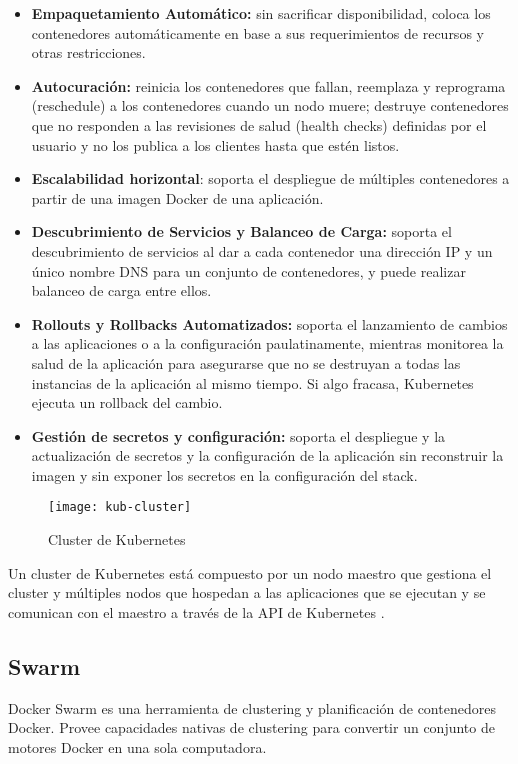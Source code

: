 \begin{itemize}

\item \textbf{Empaquetamiento Automático: }sin sacrificar disponibilidad, coloca los contenedores automáticamente en base a sus requerimientos de recursos y otras restricciones.
\item \textbf{Autocuración: }reinicia los contenedores que fallan, reemplaza y reprograma (reschedule) a los contenedores cuando un nodo muere; destruye contenedores que no responden a las revisiones de salud (health checks) definidas por el usuario y no los publica a los clientes hasta que estén listos.
\item \textbf{Escalabilidad horizontal}: soporta el despliegue de múltiples contenedores a partir de una imagen Docker de una aplicación.
\item \textbf{Descubrimiento de Servicios y Balanceo de Carga: }soporta el descubrimiento de servicios al dar a cada contenedor una dirección IP y un único nombre DNS para un conjunto de contenedores, y puede realizar balanceo de carga entre ellos.
\item \textbf{Rollouts y Rollbacks Automatizados: }soporta el lanzamiento de cambios a las aplicaciones o a la configuración paulatinamente, mientras monitorea la salud de la aplicación para asegurarse que no se destruyan a todas las instancias de la aplicación al mismo tiempo. Si algo fracasa, Kubernetes ejecuta un rollback del cambio.
\item \textbf{Gestión de secretos y configuración: }soporta el despliegue y la actualización de secretos y la configuración de la aplicación sin reconstruir la imagen y sin exponer los secretos en la configuración del stack.

\end{itemize}

\begin{figure}[H]
    \centering
    \texttt{[image: kub-cluster]}
    \caption{ Cluster de Kubernetes \protect\cite{Kubernetes2016-jo}}
    \label{fig:kub-cluster}
\end{figure}

Un cluster de Kubernetes está compuesto por un nodo maestro que gestiona el cluster y múltiples nodos que hospedan a las aplicaciones que se ejecutan y se comunican con el maestro a través de la API de Kubernetes \cite{Kubernetes2016-jo}.

\subsection{Swarm}
Docker Swarm \cite{Docker2016-yo} es una herramienta de clustering y planificación de contenedores Docker. Provee capacidades nativas de clustering para convertir un conjunto de motores Docker en una sola computadora.

